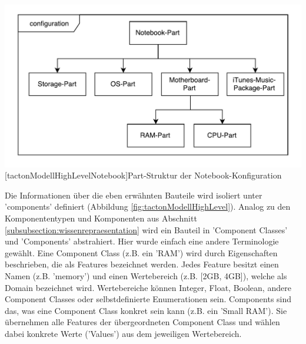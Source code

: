 \documentclass[12pt,a4paper,bibliography=totocnumbered,listof=totoc]{scrartcl}
\begin{document}
\vspace{1em}
\begin{minipage}{\linewidth}
	\centering
	\includegraphics[width=0.7\linewidth]{Abbildungen/tactonModellHighLevelNotebook.pdf}
	[tactonModellHighLevelNotebook]{Part-Struktur der Notebook-Konfiguration}
	\label{fig:tactonModellHighLevelNotebook}
\end{minipage}
\vspace{1em}

Die Informationen über die eben erwähnten Bauteile wird isoliert unter 'components' definiert (Abbildung \ref{fig:tactonModellHighLevel}). Analog zu den Komponententypen und Komponenten aus Abschnitt \ref{subsubsection:wissenrepraesentation} wird ein Bauteil in 'Component Classes' und 'Components' abstrahiert. Hier wurde einfach eine andere Terminologie gewählt. Eine Component Class (z.B. ein 'RAM') wird durch Eigenschaften beschrieben, die als Features bezeichnet werden. Jedes Feature besitzt einen Namen (z.B. 'memory') und einen Wertebereich (z.B. [2GB, 4GB]), welche als Domain bezeichnet wird. Wertebereiche können Integer, Float, Boolean, andere Component Classes oder selbstdefinierte Enumerationen sein. Components sind das, was eine Component Class konkret sein kann (z.B. ein 'Small RAM'). Sie übernehmen alle Features der übergeordneten Component Class und wählen dabei konkrete Werte ('Values') aus dem jeweiligen Wertebereich.
\end{document}
